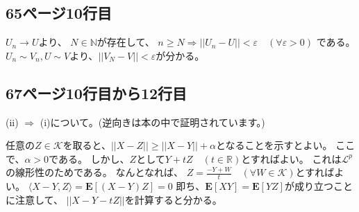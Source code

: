 \documentclass[11pt, a4paper]{jsarticle}
\theoremstyle{definition}
\newcommand{\NN}{{\mathbb{N}}} %
\newcommand{\RR}{{\mathbb{R}}} %
\begin{document}
  \subsection{65ページ10行目}
    $U_n \to U$より、
    $N \in \NN$が存在して、
    $n \ge N \Rightarrow ||U_n - U|| < \varepsilon \quad (\forall \varepsilon > 0)$
    である。
    $U_n \sim V_n, U \sim V$より、$||V_N - V|| < \varepsilon$が分かる。

  \subsection{67ページ10行目から12行目}
    (ii) $\Rightarrow$ (i)について。(逆向きは本の中で証明されています。)

    任意の$Z \in \mathcal{K}$を取ると、$||X - Z|| \ge ||X - Y|| + \alpha$となることを示すとよい。
    ここで、$\alpha > 0$である。
    しかし、$Z$として$Y + tZ \quad (t \in \RR)$とすればよい。
    これは$\mathcal{L}^p$の線形性のためである。
    なんとなれば、
    $Z = \frac{-Y+ W}{t} \quad (\forall W \in \mathcal{K})$とすればよい。
    $\langle X - Y, Z \rangle = \mathbf{E}[(X - Y)Z] = 0$
    即ち、$\mathbf{E}[XY] = \mathbf{E}[YZ]$が成り立つことに注意して、
    $||X - Y - tZ||$を計算すると分かる。
\end{document}
